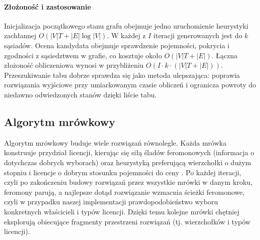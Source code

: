 \paragraph{Złożoność i zastosowanie}
Inicjalizacja początkowego stanu grafu obejmuje jedno uruchomienie heurystyki zachłannej \(O(|V|T + |E|\log |V|)\). W każdej z \(I\) iteracji generowanych jest do \(k\) sąsiadów. Ocena kandydata obejmuje sprawdzenie pojemności, pokrycia i zgodności z sąsiedztwem w grafie, co kosztuje około \(O(|V|T + |E|)\). Łączna złożoność obliczeniowa wynosi w przybliżeniu \(O\!\left(I \cdot k \cdot (|V|T + |E|)\right)\). Przeszukiwanie tabu dobrze sprawdza się jako metoda ulepszająca: poprawia rozwiązania wyjściowe przy umiarkowanym czasie obliczeń i ogranicza powroty do niedawno odwiedzonych stanów dzięki liście tabu.

\subsection{Algorytm mrówkowy}\label{subsec:aco}
Algorytm mrówkowy buduje wiele rozwiązań równolegle. Każda mrówka konstruuje przydział licencji, kierując się siłą śladów feromonowych (informacja o dotychczas dobrych wyborach) oraz heurystyką preferującą wierzchołki o dużym stopniu i licencje o dobrym stosunku pojemności do ceny \cite{dorigo1997}. Po każdej iteracji, czyli po zakończeniu budowy rozwiązań przez wszystkie mrówki w danym kroku, feromony parują, a najlepsze dotąd rozwiązanie wzmacnia ścieżki feromonowe, czyli w przypadku naszej implementacji prawdopodobieństwo wyboru konkretnych właścicieli i typów licencji. 
Dzięki temu kolejne mrówki chętniej eksplorują obiecujące fragmenty przestrzeni rozwiązań (tj. wierzchołków i typów licencji).
